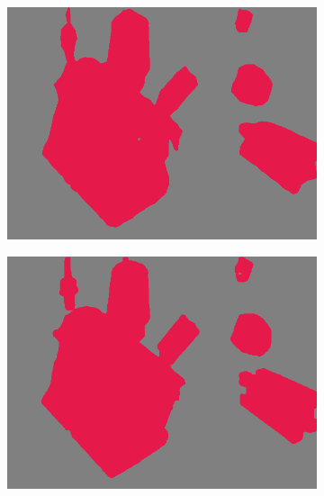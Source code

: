 \begin{figure}[h]
\begin{subfigure}{.24\textwidth}
			\includegraphics[width=1\linewidth]{images/sample_predictions/00132_mob_binary_pred}
		\end{subfigure}
		\begin{subfigure}{.24\textwidth}
			\centering
			\includegraphics[width=1\linewidth]{images/sample_predictions/00132_xcep_binary_pred}
		\end{subfigure}
		\begin{subfigure}{.24\textwidth}
			\centering

\end{subfigure}
\end{figure}
